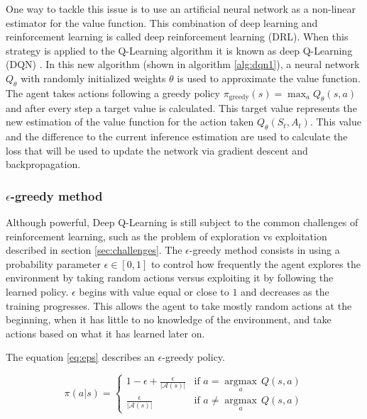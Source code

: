 One way to tackle this issue is to use an artificial neural network as a non-linear estimator for the value function. This combination of deep learning and reinforcement learning is called deep reinforcement learning (DRL). When this strategy is applied to the Q-Learning algorithm it is known as deep Q-Learning (DQN) \cite{Mnih:2013}. In this new algorithm (shown in algorithm \ref{alg:dqn1}), a neural network $Q_\theta$ with randomly initialized weights $\theta$ is used to approximate the value function. The agent takes actions following a greedy policy $\pi_\textrm{greedy}(s) = \max_a Q_\theta(s,a)$ and after every step a target value is calculated. This target value represents the new estimation of the value function for the action taken $Q_\theta(S_t, A_t)$. This value and the difference to the current inference estimation are used to calculate the loss that will be used to update the network via gradient descent and backpropagation.

\subsubsection*{$\epsilon$-greedy method}

Although powerful, Deep Q-Learning is still subject to the common challenges of reinforcement learning, such as the problem of exploration vs exploitation described in section \ref{sec:challenges}. The $\epsilon$-greedy method consists in using a probability parameter $\epsilon \in [0,1]$ to control how frequently the agent explores the environment by taking random actions versus exploiting it by following the learned policy. $\epsilon$ begins with value equal or close to $1$ and decreases as the training progresses. This allows the agent to take mostly random actions at the beginning, when it has little to no knowledge of the environment, and take actions based on what it has learned later on.

The equation \ref{eq:eps} describes an $\epsilon$-greedy policy.

\begin{equation}
\label{eq:eps}
    \pi(a|s) =
    \begin{cases}
        1-\epsilon + \frac{\epsilon}{|\mathcal{A}(s)|} & \textrm{if $a = \underset{a}{\operatorname{argmax}}\,Q(s, a)$}\\
        \frac{\epsilon}{|\mathcal{A}(s)|} & \textrm{if $a \neq \underset{a}{\operatorname{argmax}}\,Q(s, a)$}
    \end{cases}
\end{equation}

